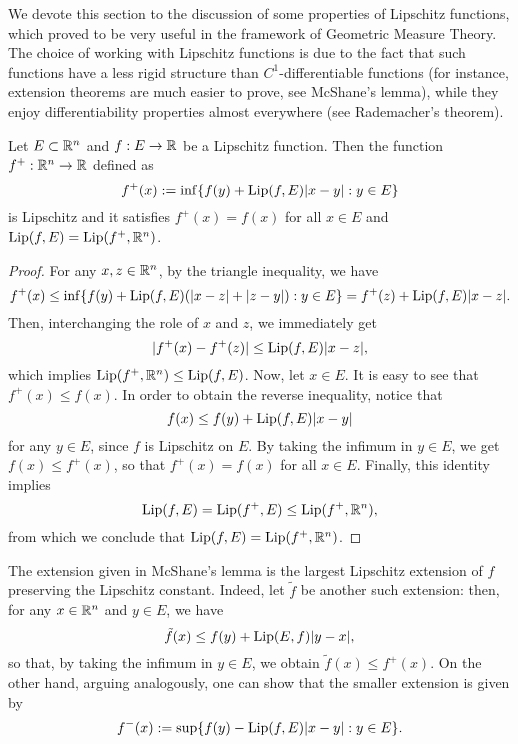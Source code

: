 We devote this section to the discussion of some properties of Lipschitz functions, which proved to be very useful in the framework of Geometric Measure Theory. 
The choice of working with Lipschitz functions is due to the fact that such functions have a less rigid structure than $C^{1}$-differentiable functions (for instance, extension theorems are much easier to prove, see McShane's lemma), while they enjoy differentiability properties almost everywhere (see Rademacher's theorem).

\begin{lemma} \label{McShane_lemma}
Let $E \subset \mathbb{R}^{n}$ and $f: E \to \mathbb{R}$ be a Lipschitz function. Then the function $f^{+} : \mathbb{R}^{n} \to \mathbb{R}$ defined as
\begin{equation*}
f^{+}(x) := \inf \{ f(y) + \operatorname{Lip}(f, E) |x - y| : y \in E\}
\end{equation*}
is Lipschitz and it satisfies $f^{+}(x) = f(x)$ for all $x \in E$ and $\operatorname{Lip}(f, E) = \operatorname{Lip}(f^{+}, \mathbb{R}^{n})$.
\end{lemma}
\begin{proof}
For any $x, z \in \mathbb{R}^{n}$, by the triangle inequality, we have
\begin{equation*}
f^{+}(x) \le \inf \{ f(y) + \operatorname{Lip}(f, E) (|x - z| + |z - y|) : y \in E \} = f^{+}(z) + \operatorname{Lip}(f, E) |x - z|.
\end{equation*}
Then, interchanging the role of $x$ and $z$, we immediately get
\begin{equation*}
|f^{+}(x) - f^{+}(z)| \le \operatorname{Lip}(f, E) |x - z|,
\end{equation*}
which implies $\operatorname{Lip}(f^{+}, \mathbb{R}^{n}) \le \operatorname{Lip}(f, E)$.
Now, let $x \in E$. It is easy to see that $f^{+}(x) \le f(x)$. In order to obtain the reverse inequality, notice that 
\begin{equation*}
f(x) \le f(y) + \operatorname{Lip}(f, E)|x - y|
\end{equation*}
for any $y \in E$, since $f$ is Lipschitz on $E$. By taking the infimum in $y \in E$, we get $f(x) \le f^{+}(x)$, so that $f^{+}(x) = f(x)$ for all $x \in E$. Finally, this identity implies
\begin{equation*}
\operatorname{Lip}(f, E) = \operatorname{Lip}(f^{+}, E) \le \operatorname{Lip}(f^{+}, \mathbb{R}^{n}),
\end{equation*}
from which we conclude that $\operatorname{Lip}(f, E) = \operatorname{Lip}(f^{+}, \mathbb{R}^{n})$.
\end{proof}

\begin{remark} The extension given in McShane's lemma is the largest Lipschitz extension of $f$ preserving the Lipschitz constant. Indeed, let $\tilde{f}$ be another such extension: then, for any $x \in \mathbb{R}^{n}$ and $y \in E$, we have
\begin{equation*}
\tilde{f}(x) \le f(y) + \operatorname{Lip}(E, f) |y - x|,
\end{equation*} 
so that, by taking the infimum in $y \in E$, we obtain $\tilde{f}(x) \le f^{+}(x)$. On the other hand, arguing analogously, one can show that the smaller extension is given by
\begin{equation*}
f^{-}(x) := \sup \{ f(y) - \operatorname{Lip}(f, E) |x - y| : y \in E \}.
\end{equation*}
\end{remark}


